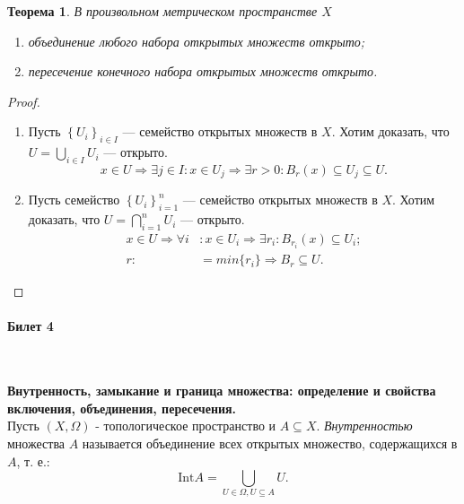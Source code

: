 \documentclass[a4paper,100pt]{article}
\theoremstyle{indented}
\newtheorem{theorem}{Теорема}
\begin{document}
\begin{itemize}
\begin{theorem}
    В произвольном метрическом пространстве $X$ 
    \begin{enumerate}
        \item объединение любого набора открытых множеств открыто;
        \item пересечение конечного набора открытых множеств открыто.
    \end{enumerate}
    \end{theorem}
    \begin{proof}
    \
    \begin{enumerate}
        \item Пусть $\left\{U_i\right\}_{i \in I}$ --- семейство открытых множеств в $X$.
        Хотим доказать, что $U = \bigcup_{i \in I}U_i$ --- открыто.
        \[
            x \in U \Rightarrow \exists j \in I : x \in U_j \Rightarrow \exists r > 0: B_r(x) \subseteq U_j \subseteq U.
        \]
        \item
        Пусть семейство $\left\{U_i\right\}_{i=1}^n$ --- семейство открытых множеств в $X$.
        Хотим доказать, что $U = \bigcap_{i=1}^n U_i$ --- открыто.
        \[
            \begin{aligned}
        x \in U \Rightarrow \forall i&: x \in U_i \Rightarrow \exists r_i: B_{r_i} (x) \subseteq U_i; \\ 
        r :&= min\{r_i\} \Rightarrow B_r \subseteq U.
            \end{aligned}
        \]
    \end{enumerate}
    \end{proof}
    \end{itemize}



  
\paragraph{Билет 4} \

\medskip
    
\textbf{Внутренность, замыкание и граница множества: определение и свойства включения, объединения, пересечения.} \\

Пусть $(X, \Omega)$ - топологическое пространство и $A\subseteq X$. \textit{Внутренностью} множества $A$ называется объединение всех открытых множество, содержащихся в $A$, т. е.:
\[
    \text{Int} A = \bigcup_{U\in \Omega, U\subseteq A} U.
\]
\end{document}

